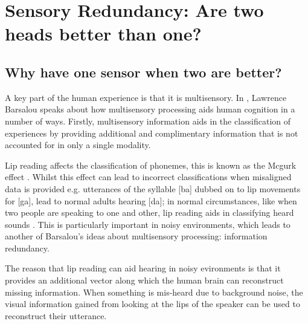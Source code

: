 
\chapter{Sensory Redundancy: Are two heads better than one?} %

\label{Chapter4} %



\section{Why have one sensor when two are better?}
A key part of the human experience is that it is multisensory. In \cite{barsalou2008grounded}, Lawrence Barsalou speaks about how multisensory processing aids human cognition in a number of ways. Firstly, multisensory information aids in the classification of experiences by providing additional and complimentary information that is not accounted for in only a single modality. 

Lip reading affects the classification of phonemes, this is known as the Mcgurk effect \cite{mcgurk1976hearing}. Whilst this effect can lead to incorrect classifications when misaligned data is provided e.g. utterances of the syllable [ba] dubbed on to lip movements for [ga], lead to normal adults hearing [da]; in normal circumstances, like when two people are speaking to one and other, lip reading aids in classifying heard sounds \cite{ma2009lip}. This is particularly important in noisy environments, which leads to another of Barsalou's ideas about multisensory processing: information redundancy.

The reason that lip reading can aid hearing in noisy evironments is that it provides an additional vector along which the human brain can reconstruct missing information. When something is mis-heard due to background noise, the visual information gained from looking at the lips of the speaker can be used to reconstruct their utterance.

